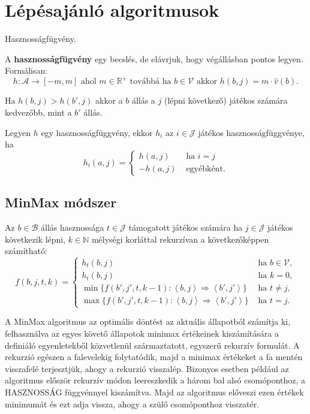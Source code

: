 \section{Lépésajánló algoritmusok}

\begin{definicio}
    Hasznosságfügvény.

    A {\bf hasznosságfügvény} egy becslés, de elávrjuk, hogy végállásban pontos
    legyen. Formálisan: \[
        h  : \mathcal{A} \to [-m, m] \text{ ahol } m \in \mathbb{R}^+
        \text{ továbbá ha } b \in \mathcal{V} \text{ akkor }
        h(b,j) = m \cdot \hat{v}(b)
    .\]

    Ha $h(b,j) > h(b', j)$ akkor a $b$ állás a $j$ (lépni következő) játékos
    számára kedvezőbb, mint a $b'$ állás.

    Legyen $h$ egy hasznosságfüggvény, ekkor $h_i$ az $i \in \mathcal{J}$ játékos
    hasznosságfüggvénye, ha \[
        h_i(a,j) = \begin{cases}
            h(a,j) & \text{ ha } i = j \\
            -h(a,j) & \text{ egyébként.}
        \end{cases}
    \]
\end{definicio}

\subsection{MinMax módszer}

Az $b \in \mathcal{B}$ állás hasznossága $t \in \mathcal{J}$ támogatott játékos
számára ha $j \in \mathcal{J}$ játékos következik lépni, $k \in \mathbb{N}$
mélységi korláttal rekurzívan a következőképpen számítható:
\[
    f(b, j, t, k) =
    \begin{cases}
        h_t(b,j) & \text{ ha } b \in \mathcal{V} ,\\
        h_t(b,j) & \text{ ha } k = 0 ,\\
        \min \{ f(b', j', t, k-1) : \left<b, j \right> \Rightarrow \left<b', j' \right>\}
        & \text{ ha } t \neq j ,\\
        \max \{ f(b', j', t, k-1) : \left<b, j \right> \Rightarrow \left<b', j' \right>\}
        & \text{ ha } t = j.
    \end{cases}
\]

A MinMax algoritmus az optimális döntést az aktuális állapotból számítja ki,
felhasználva az egyes követő állapotok minimax értékeinek kiszámítására a
definiáló egyenletekből közvetlenül származtatott, egyszerű rekurzív formulát.
A rekurzió egészen a falevelekig folytatódik, majd a minimax értékeket a fa
mentén visszafelé terjesztjük, ahogy a rekurzió visszalép.  Bizonyos esetben
például az algoritmus először rekurzív módon leereszkedik a három bal alsó
csomóponthoz, a HASZNOSSÁG függvénnyel kiszámítva.  Majd az algoritmus előveszi
ezen értékek minimumát és ezt adja vissza, ahogy a szülő csomóponthoz
visszatér.


